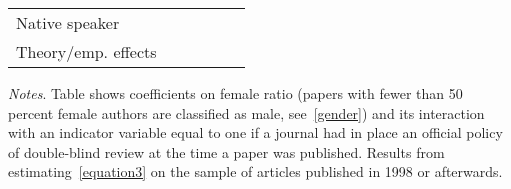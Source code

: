 \begin{table}[H]
\begin{threeparttable}
\begin{tabular}{p{4cm}S@{}S@{}S@{}S@{}S@{}}
            Native speaker                &           {}   &           {}   &           {}   &           {}   &           {}   \\
            Theory/emp. effects           &           {}   &           {}   &           {}   &           {}   &           {}   \\
            \bottomrule
        \end{tabular}
        \begin{tablenotes}
            \tiny
            \item \textit{Notes}. Table shows coefficients on female ratio (papers with fewer than 50 percent female authors are classified as male, see~\autoref{gender}) and its interaction with an indicator variable equal to one if a journal had in place an official policy of double-blind review at the time a paper was published. Results from estimating~\autoref{equation3} on the sample of articles published in 1998 or afterwards.
        \end{tablenotes}
    \end{threeparttable}
\end{table}